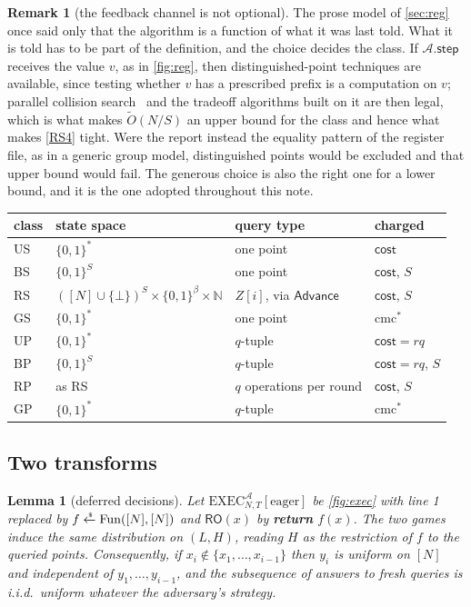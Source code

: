 \documentclass[11pt]{article}
\theoremstyle{plain}
\newtheorem{lemma}{Lemma}
\theoremstyle{definition}
\newtheorem{remark}{Remark}
\newcommand{\NN}{[N]}
\newcommand{\advers}{\mathcal{A}}
\newcommand{\cmcs}{\mathrm{cmc}^{*}}
\newcommand{\Advance}{\mathsf{Advance}}
\newcommand{\cls}[1]{\textsf{#1}}   %
\newcommand{\getsr}{\mathrel{\xleftarrow{\raisebox{-0.15ex}{\tiny\$}}}}
\newcommand{\stp}{\mathsf{step}}
\newcommand{\Exec}{\mathrm{EXEC}}
\newcommand{\RO}{\mathsf{RO}}
\begin{document}
\begin{remark}[the feedback channel is not optional]\label{r:feedback}
The prose model of \cref{sec:reg} once said only that the algorithm is a
function of what it was last told.  What it is told has to be part of the
definition, and the choice decides the class.  If $\advers.\stp$ receives
the value $v$, as in \cref{fig:reg}, then distinguished-point techniques are
available, since testing whether $v$ has a prescribed prefix is a
computation on $v$; parallel collision search~\cite{OW99} and the tradeoff
algorithms built on it are then legal, which is what makes $\tilde O(N/S)$
an upper bound for the class and hence what makes \cref{RS4} tight.  Were
the report instead the equality pattern of the register file, as in a
generic group model, distinguished points would be excluded and that upper
bound would fail.  The generous choice is also the right one for a lower
bound, and it is the one adopted throughout this note.
\end{remark}

\begin{center}
\small
\begin{tabular}{@{}llll@{}}
\toprule
class & state space & query type & charged \\
\midrule
\cls{US} & $\{0,1\}^{*}$ & one point & $\mathsf{cost}$ \\
\cls{BS} & $\{0,1\}^{S}$ & one point & $\mathsf{cost}$, $S$ \\
\cls{RS} & $(\NN\cup\{\bot\})^{S}\times\{0,1\}^{\beta}\times\mathbb{N}$
  & $Z[i]$, via $\Advance$ & $\mathsf{cost}$, $S$ \\
\cls{GS} & $\{0,1\}^{*}$ & one point & $\cmcs$ \\
\cls{UP} & $\{0,1\}^{*}$ & $q$-tuple & $\mathsf{cost}=rq$ \\
\cls{BP} & $\{0,1\}^{S}$ & $q$-tuple & $\mathsf{cost}=rq$, $S$ \\
\cls{RP} & as \cls{RS} & $q$ operations per round & $\mathsf{cost}$, $S$ \\
\cls{GP} & $\{0,1\}^{*}$ & $q$-tuple & $\cmcs$ \\
\bottomrule
\end{tabular}
\end{center}

\subsection{Two transforms}\label{app:transforms}

\begin{lemma}[deferred decisions]\label{l:lazy}
Let $\Exec^{\advers}_{N,T}[\mathrm{eager}]$ be \cref{fig:exec} with line 1
replaced by $f \getsr \mathrm{Fun}(\NN,\NN)$ and $\RO(x)$ by
\textbf{return} $f(x)$.  The two games induce the same distribution on
$(L,H)$, reading $H$ as the restriction of $f$ to the queried points.
Consequently, if $x_{i} \notin \{x_{1},\dots,x_{i-1}\}$ then $y_{i}$ is
uniform on $\NN$ and independent of $y_{1},\dots,y_{i-1}$, and the
subsequence of answers to fresh queries is i.i.d.\ uniform whatever the
adversary's strategy.
\end{lemma}
\end{document}
